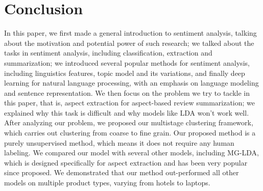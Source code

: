 \chapter{Conclusion}

In this paper, we first made a general introduction to sentiment analysis, talking about the motivation and potential power of such research; we talked about the tasks in sentiment analysis, including classification, extraction and summarization; we introduced several popular methods for sentiment analysis, including linguistics features, topic model and its variations, and finally deep learning for natural language processing, with an emphasis on language modeling and sentence representation. We then focus on the problem we try to tackle in this paper, that is, aspect extraction for aspect-based review summarization; we explained why this task is difficult and why models like LDA won't work well. After analyzing our problem, we proposed our multistage clustering framework, which carries out clustering from coarse to fine grain. Our proposed method is a purely unsupervised method, which means it does not require any human labeling. We compared our model with several other models, including MG-LDA, which is designed specifically for aspect extraction and has been very popular since proposed. We demonstrated that our method out-performed all other models on multiple product types, varying from hotels to laptops.
